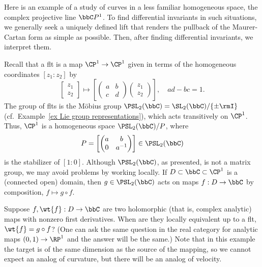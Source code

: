 \begin{example}\label{ex projective structures and schwarzians}
    Here is an example of a study of curves in a less familiar homogeneous space, the complex projective line $\bbC  P^1$. To find differential invariants in such situations, we generally seek a uniquely defined lift that renders the pullback of the Maurer-Cartan form as simple as possible. Then, after finding differential invariants, we interpret them.

    Recall that a \gls{flt} is a map $\CP^1\to \CP^1$ given in terms of the homogeneous coordinates $[z_1:z_2]$ by 
    \[
        \begin{bmatrix}
            z_1\\z_2
        \end{bmatrix}
        \mapsto \left[\begin{pmatrix}
            a & b\\
            c& d
        \end{pmatrix}
        \begin{pmatrix}
            z_1\\z_2
        \end{pmatrix}\right],\quad ad-bc=1.
    \]
    The group of \glspl{flt} is the M\"obius group $\PSL_2(\bbC)=\SL_2(\bbC)\slash \{\pm \rmI\}$ (cf.\ Example~\ref{ex Lie group representations}), which acts transitively on $\CP^1$.  Thus, $\CP^1$ is a homogeneous space $\PSL_2(\bbC)\slash P$, where 
    \[P=\left[
        \begin{pmatrix}
            a & b \\
            0 & a^{-1}
        \end{pmatrix}
    \right]\in\PSL_2(\bbC)\]
    is the stabilizer of $[1:0]$. Although $\PSL_2(\bbC)$, as presented, is not a matrix group, we may avoid problems by working locally. If $D\subset \bbC\subset\CP^1$ is a (connected open) domain, then $g\in\PSL_2(\bbC)$ acts on maps $f:D\to \bbC$ by composition, $f\mapsto g\circ f$.

    Suppose $f,\wt{f}:D\to \bbC$ are two holomorphic (that is, complex analytic) maps with nonzero first derivatives. When are they locally equivalent up to a \gls{flt}, $\wt{f}=g\circ f$? (One can ask the same question in the real category for analytic maps $(0,1)\to \RP^1$ and the answer will be the same.) Note that in this example the target is of the same dimension as the source of the mapping, so we cannot expect an analog of curvature, but there will be an analog of velocity.


\end{example}
